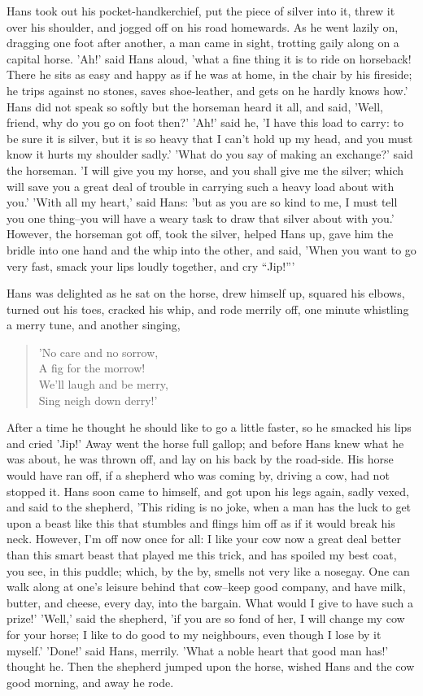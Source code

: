 \documentclass[12pt]{book}
\begin{document}
Hans took out his pocket-handkerchief, put the piece of silver into
it, threw it over his shoulder, and jogged off on his road homewards.
As he went lazily on, dragging one foot after another, a man came in
sight, trotting gaily along on a capital horse. 'Ah!' said Hans aloud,
'what a fine thing it is to ride on horseback! There he sits as easy
and happy as if he was at home, in the chair by his fireside; he trips
against no stones, saves shoe-leather, and gets on he hardly knows
how.' Hans did not speak so softly but the horseman heard it all, and
said, 'Well, friend, why do you go on foot then?' 'Ah!' said he, 'I
have this load to carry: to be sure it is silver, but it is so heavy
that I can't hold up my head, and you must know it hurts my shoulder
sadly.' 'What do you say of making an exchange?' said the horseman. 'I
will give you my horse, and you shall give me the silver; which will
save you a great deal of trouble in carrying such a heavy load about
with you.' 'With all my heart,' said Hans: 'but as you are so kind to
me, I must tell you one thing--you will have a weary task to draw that
silver about with you.' However, the horseman got off, took the
silver, helped Hans up, gave him the bridle into one hand and the whip
into the other, and said, 'When you want to go very fast, smack your
lips loudly together, and cry ``Jip!'''

Hans was delighted as he sat on the horse, drew himself up, squared
his elbows, turned out his toes, cracked his whip, and rode merrily
off, one minute whistling a merry tune, and another singing,

\begin{verse}
 'No care and no sorrow,\\
  A fig for the morrow!\\
  We'll laugh and be merry,\\
  Sing neigh down derry!'
\end{verse}

After a time he thought he should like to go a little faster, so he
smacked his lips and cried 'Jip!' Away went the horse full gallop; and
before Hans knew what he was about, he was thrown off, and lay on his
back by the road-side. His horse would have ran off, if a shepherd who
was coming by, driving a cow, had not stopped it. Hans soon came to
himself, and got upon his legs again, sadly vexed, and said to the
shepherd, 'This riding is no joke, when a man has the luck to get upon
a beast like this that stumbles and flings him off as if it would
break his neck. However, I'm off now once for all: I like your cow now
a great deal better than this smart beast that played me this trick,
and has spoiled my best coat, you see, in this puddle; which, by the
by, smells not very like a nosegay. One can walk along at one's
leisure behind that cow--keep good company, and have milk, butter, and
cheese, every day, into the bargain. What would I give to have such a
prize!' 'Well,' said the shepherd, 'if you are so fond of her, I will
change my cow for your horse; I like to do good to my neighbours, even
though I lose by it myself.' 'Done!' said Hans, merrily. 'What a noble
heart that good man has!' thought he. Then the shepherd jumped upon
the horse, wished Hans and the cow good morning, and away he rode.
\end{document}
